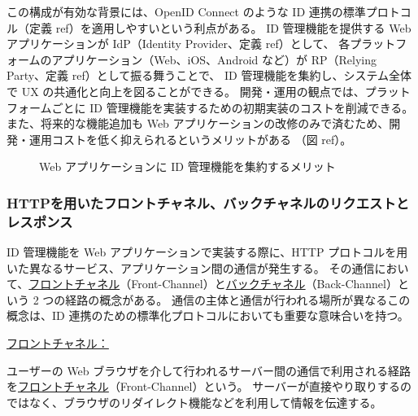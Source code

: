 \documentclass[uplatex]{jsarticle}
\def\ref#1{ref}%
\def\label#1{}%
\begin{document}
この構成が有効な背景には、OpenID Connect のような ID 連携の標準プロトコル（定義 \ref{dfn:federation-protocol}）を適用しやすいという利点がある。
ID 管理機能を提供する Web アプリケーションが IdP（Identity Provider、定義 \ref{dfn:idp}）として、
各プラットフォームのアプリケーション（Web、iOS、Android など）が RP（Relying Party、定義 \ref{dfn:rp}）として振る舞うことで、
ID 管理機能を集約し、システム全体で UX の共通化と向上を図ることができる。
開発・運用の観点では、プラットフォームごとに ID 管理機能を実装するための初期実装のコストを削減できる。
また、将来的な機能追加も Web アプリケーションの改修のみで済むため、開発・運用コストを低く抑えられるというメリットがある
（図 \ref{fig:ch6-web-idm}）。

\begin{figure}[H]
\centering
{}
\caption{Web アプリケーションに ID 管理機能を集約するメリット}\label{fig:ch6-web-idm}
\end{figure}

\subsubsection{HTTPを用いたフロントチャネル、バックチャネルのリクエストとレスポンス}

ID 管理機能を Web アプリケーションで実装する際に、HTTP プロトコルを用いた異なるサービス、アプリケーション間の通信が発生する。
その通信において、\underline{フロントチャネル}（Front-Channel）と\underline{バックチャネル}（Back-Channel）という 2 つの経路の概念がある。
通信の主体と通信が行われる場所が異なるこの概念は、ID 連携のための標準化プロトコルにおいても重要な意味合いを持つ。

\underline{フロントチャネル：}

\begin{dfn}[フロントチャネル]\label{dfn:front-channel}
ユーザーの Web ブラウザを介して行われるサーバー間の通信で利用される経路を\underline{フロントチャネル}（Front-Channel）という。
サーバーが直接やり取りするのではなく、ブラウザのリダイレクト機能などを利用して情報を伝達する。
\end{dfn}
\end{document}
